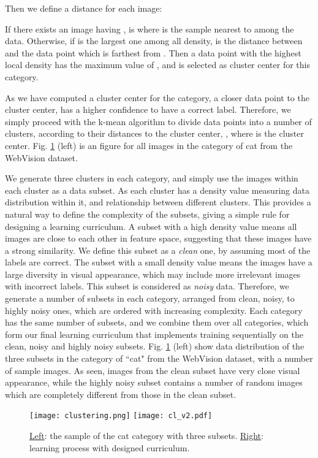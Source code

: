 \documentclass[runningheads]{llncs}
\begin{document}
Then we define a distance  for each image:


If there exists an image  having ,  is  where  is the sample nearest to  among the data. Otherwise, if  is the largest one among all density,  is the distance between  and the data point which is farthest from . Then a data point with the highest local density has the maximum value of , and is selected as cluster center for this category.


As we have computed a cluster center for the category, a closer data point to the cluster center, has a higher confidence to have a correct label.
Therefore, we simply proceed with the k-mean algorithm to divide data points into a number of clusters, according to their distances to the cluster center, , where  is the cluster center. Fig. \ref{fig:curriculum_learning} (left) is an  figure for all images in the category of cat from the WebVision dataset.

We generate three clusters in each category, and simply use the images within each cluster as a data subset. As each cluster has a density value measuring data distribution within it, and relationship between different clusters. This provides a natural way to define the complexity of the subsets, giving a simple rule for designing a learning curriculum. A subset with a high density value means all images are close to each other in feature space, suggesting that these images have a strong similarity. We define this subset as a \emph{clean} one, by assuming most of the labels are correct. The subset with a small density value means the images have a large diversity in visual appearance, which may include more irrelevant images with incorrect labels. This subset is considered as \emph{noisy} data. Therefore, we generate a number of subsets in each category, arranged from clean, noisy, to highly noisy ones, which are ordered with increasing complexity. Each category has the same number of  subsets, and we combine them over all categories, which form our final learning curriculum that implements training sequentially on the clean, noisy and highly noisy subsets.  Fig. \ref{fig:curriculum_learning} (left) show data distribution of the three subsets in the category of ``cat" from the WebVision dataset, with a number of sample images. As seen, images from the clean subset have very close visual appearance, while the highly noisy subset contains a number of random images which are completely different from those in the clean subset.

\begin{figure}[tb]
	\begin{center}
		\texttt{[image: clustering.png]}
		\texttt{[image: cl\_v2.pdf]}
	\end{center}
	\caption{\underline{Left}: the sample of the cat category with three subsets. \underline{Right}: learning process with designed curriculum.}
	\label{fig:curriculum_learning}
\end{figure}
\end{document}
